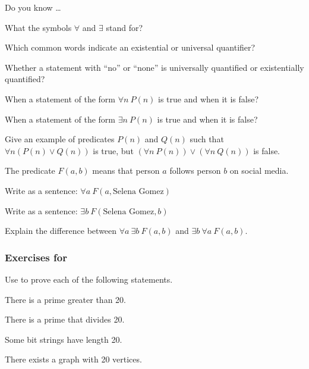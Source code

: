 \begin{exer}[\exerR] %
\label{exer_dyk_quants}
    Do you know \ldots
        \begin{exerpart}
            \item What the symbols $\forall$ and $\exists$ stand for?
            \item Which common words indicate an existential or universal quantifier?  
            \item Whether a statement with ``no'' or ``none'' is universally quantified or existentially quantified? 
            \item When a statement of the form $\forall n ~ P(n)$ is true and when it is false?
            \item When a statement of the form $\exists n ~ P(n)$ is true and when it is false?    
        \end{exerpart}
\end{exer}

\begin{exer}[\exerE] %
\label{exer_quants_not_distribute_or}
    Give an example of predicates $P(n)$ and $Q(n)$ such that $\forall n (P(n) \lor Q(n))$ is true, but $(\forall n~ P(n)) \lor (\forall n~ Q(n))$ is false.
\end{exer}

\begin{exer}[\exerE] %
\label{exer_follows_social_media}
    The predicate $F(a,b)$ means that person $a$ follows person $b$ on social media. 
        \begin{exerpart}
            \item Write as a sentence: $\forall a ~ F(a, \text{Selena Gomez})$
            \item Write as a sentence: $\exists b ~ F(\text{Selena Gomez}, b)$
            \item Explain the difference between $\forall a ~ \exists b ~ F(a,b)$ and $\exists b ~ \forall a ~ F(a,b)$.
        \end{exerpart}
\end{exer}

\subsubsection*{Exercises for  \subpffquants}

\begin{exer}[\exerP] %
\label{exer_easy_proofs_exists}
    Use  to prove each of the following statements.  
        \begin{exerpart}
            \item There is a prime greater than 20.
            \item There is a prime that divides 20.
            \item Some bit strings have length 20.
            \item There exists a graph with 20 vertices.
        \end{exerpart}
\end{exer}


